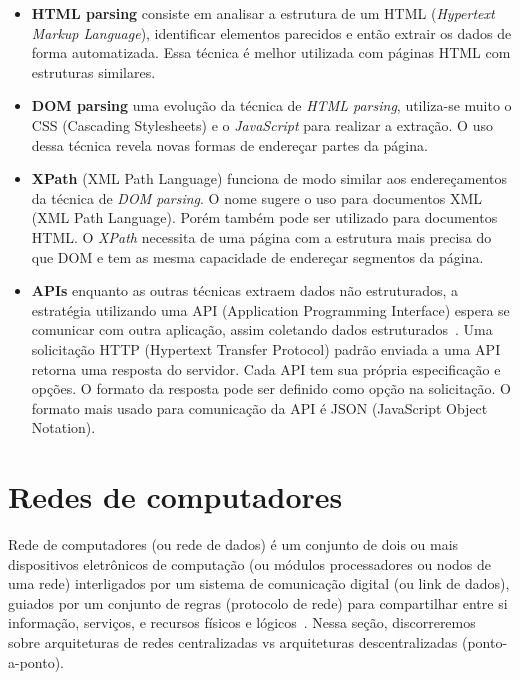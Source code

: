 \begin{itemize}
    \item \textbf{HTML parsing} consiste em analisar a estrutura de um HTML (\textit{Hypertext Markup Language}), identificar elementos parecidos e então extrair os dados de forma automatizada.
          Essa técnica é melhor utilizada com páginas HTML com estruturas similares.
    \item \textbf{DOM parsing} uma evolução da técnica de \textit{HTML parsing}, utiliza-se muito o CSS (Cascading Stylesheets) e o \textit{JavaScript} para  realizar a extração.
          O uso dessa técnica revela novas formas de endereçar partes da página.
    \item \textbf{XPath} (XML Path Language) funciona de modo similar aos endereçamentos da técnica de \textit{DOM parsing}.
          O nome sugere o uso para documentos XML (XML Path Language).
          Porém também pode ser utilizado para documentos HTML.
          O \textit{XPath} necessita de uma página com a estrutura mais precisa do que DOM e tem as mesma capacidade de endereçar segmentos da página.
    \item \textbf{APIs} enquanto as outras técnicas extraem dados não estruturados, a estratégia utilizando uma API (Application Programming Interface) espera se comunicar com outra aplicação, assim coletando dados estruturados~\cite{Scraping2}.
          Uma solicitação HTTP (Hypertext Transfer Protocol) padrão enviada a uma API retorna uma resposta do servidor.
          Cada API tem sua própria especificação e opções.
          O formato da resposta pode ser definido como opção na solicitação.
          O formato mais usado para comunicação da API é JSON (JavaScript Object Notation).
\end{itemize}

\section{Redes de computadores}

Rede de computadores (ou rede de dados) é um conjunto de dois ou mais dispositivos eletrônicos de computação (ou módulos processadores ou nodos de uma rede) interligados por um sistema de comunicação digital (ou link de dados), guiados por um conjunto de regras (protocolo de rede) para compartilhar entre si informação, serviços, e recursos físicos e lógicos~\cite{wiki:redecomputadores}.
Nessa seção, discorreremos sobre arquiteturas de redes centralizadas vs arquiteturas descentralizadas (ponto-a-ponto).

